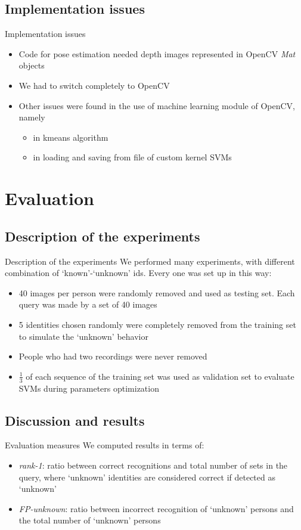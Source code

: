 \documentclass[unknownkeysallowed]{beamer}
\begin{document}
\subsection{Implementation issues}
\begin{frame}{Implementation issues}
	\begin{itemize}
		\item Code for pose estimation needed depth images represented in OpenCV \textit{Mat} objects
		\item We had to switch completely to OpenCV
		\item Other issues were found in the use of machine learning module of OpenCV, namely
			\begin{itemize}
				\item in kmeans algorithm
				\item in loading and saving from file of custom	kernel SVMs
			\end{itemize}
	\end{itemize}
\end{frame}

\section{Evaluation}
\subsection{Description of the experiments}
\begin{frame}{Description of the experiments}
	We performed many experiments, with different combination of `known'-`unknown' ids. Every one was set up in this way:
	\begin{itemize}
		\item 40 images per person were randomly removed and used as testing set. Each query was made by a set of 40 images
		\item 5 identities chosen randomly were completely removed from the training set to simulate the `unknown' behavior
		\item People who had two recordings were never removed
		\item $\frac{1}{3}$ of each sequence of the training set was used as validation set to evaluate SVMs during parameters optimization
	\end{itemize}
\end{frame}

\subsection{Discussion and results}
\begin{frame}{Evaluation measures}
	We computed results in terms of:
	\begin{itemize}
		\item \textit{rank-1}: ratio between correct recognitions and total number of sets in the query, where `unknown' identities are considered correct if detected as	`unknown'
		\item \textit{FP-unknown}: ratio between incorrect recognition of `unknown' persons and the total number of `unknown' persons
	\end{itemize}
\end{frame}
\end{document}
